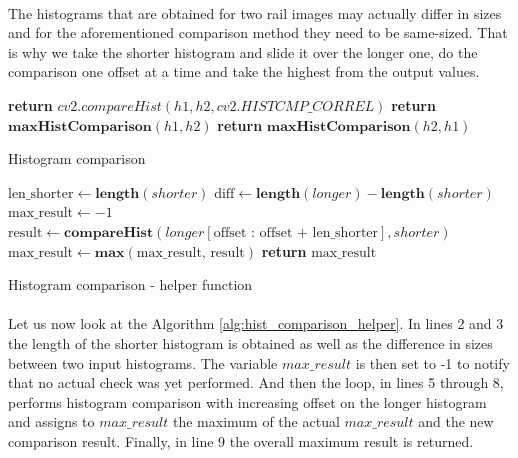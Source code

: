 \paragraph{}
The histograms that are obtained for two rail images may actually differ in sizes and for the aforementioned comparison method they need to be same-sized. That is why we take the shorter histogram and slide it over the longer one, do the comparison one offset at a time and take the highest from the output values.

\begin{algorithm}
	\begin{spacing}{1.5}
	\begin{algorithmic}[1]
				\State \textbf{return} $cv2.compareHist(h1, h2, cv2.HISTCMP\_CORREL)$
				\State \textbf{return} $\textbf{maxHistComparison}(h1, h2)$
			\Else
				\State \textbf{return} $\textbf{maxHistComparison}(h2, h1)$
			\EndIf
		\EndFunction
	\end{algorithmic}
	\end{spacing}
	\caption{Histogram comparison}
	\label{alg:hist_comparison}
\end{algorithm}

\begin{algorithm}
	\begin{spacing}{1.5}
	\begin{algorithmic}[1]
			\State $\text{len\_shorter} \gets \textbf{length}(shorter)$
			\State $\text{diff} \gets \textbf{length}(longer) - \textbf{length}(shorter)$
			\State $\text{max\_result} \gets -1$
				\State $\text{result} \gets \textbf{compareHist}(longer[\text{offset : offset + len\_shorter}], shorter)$
				\State $\text{max\_result} \gets \textbf{max}(\text{max\_result, result})$
			\EndFor
			\State \textbf{return} $\text{max\_result}$
		\EndFunction
	\end{algorithmic}
	\end{spacing}
	\caption{Histogram comparison - helper function}
	\label{alg:hist_comparison_helper}
\end{algorithm}

\paragraph{}
Let us now look at the Algorithm \ref{alg:hist_comparison_helper}. In lines 2 and 3 the length of the shorter histogram is obtained as well as the difference in sizes between two input histograms. The variable $max\_result$ is then set to -1 to notify that no actual check was yet performed. And then the loop, in lines 5 through 8, performs histogram comparison with increasing offset on the longer histogram and assigns to $max\_result$ the maximum of the actual $max\_result$ and the new comparison result. Finally, in line 9 the overall maximum result is returned.


